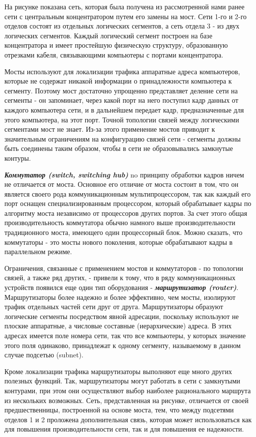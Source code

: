 На рисунке показана сеть, которая была получена из рассмотренной нами ранее сети с центральным концентратором путем его замены на мост.
Сети 1-го и 2-го отделов состоят из отдельных логических сегментов, а сеть отдела 3 - из двух логических сегментов.
Каждый логический сегмент построен на базе концентратора и имеет простейшую физическую структуру, образованную отрезками кабеля, связывающими компьютеры с портами концентратора.

Мосты используют для локализации трафика аппаратные адреса компьютеров, которые не содержат никакой информации о принадлежности компьютера к сегменту.
Поэтому мост достаточно упрощенно представляет деление сети на сегменты - он запоминает, через какой порт на него поступил кадр данных от каждого компьютера сети, и в дальнейшем передает кадр, предназначенные для этого компьютера, на этот порт.
Точной топологии связей между логическими сегментами мост не знает.
Из-за этого применение мостов приводит к значительным ограничениям на конфигурацию связей сети - сегменты должны быть соединены таким образом, чтобы в сети не образовывались замкнутые контуры.

\textbf{\textit{Коммутатор (switch, switching hub)}} no принципу обработки кадров ничем не отличается от моста.
Основное его отличие от моста состоит в том, что он является своего рода коммуникационным мультипроцессором, так как каждый его порт оснащен специализированным процессором, который обрабатывает кадры по алгоритму моста независимо от процессоров других портов.
За счет этого общая производительность коммутатора обычно намного выше производительности традиционного моста, имеющего один процессорный блок.
Можно сказать, что коммутаторы - это мосты нового поколения, которые обрабатывают кадры в параллельном режиме.

Ограничения, связанные с применением мостов и коммутаторов - по топологии связей, а также ряд других, - привели к тому, что в ряду коммуникационных устройств появился еще один тип оборудования - \textbf{\textit{маршрутизатор (router)}}.
Маршрутизаторы более надежно и более эффективно, чем мосты, изолируют трафик отдельных частей сети друг от друга.
Маршрутизаторы образуют логические сегменты посредством явной адресации, поскольку используют не плоские аппаратные, а числовые составные (иерархические) адреса.
В этих адресах имеется поле номера сети, так что все компьютеры, у которых значение этого поля одинаково, принадлежат к одному сегменту, называемому в данном случае подсетью (subnet).

Кроме локализации трафика маршрутизаторы выполняют еще много других полезных функций.
Так, маршрутизаторы могут работать в сети с замкнутыми контурами, при этом они осуществляют выбор наиболее рационального маршрута из нескольких возможных.
Сеть, представленная на рисунке, отличается от своей предшественницы, построенной на основе моста, тем, что между подсетями отделов 1 и 2 проложена дополнительная связь, которая может использоваться как для повышения производительности сети, так и для повышения ее надежности.

